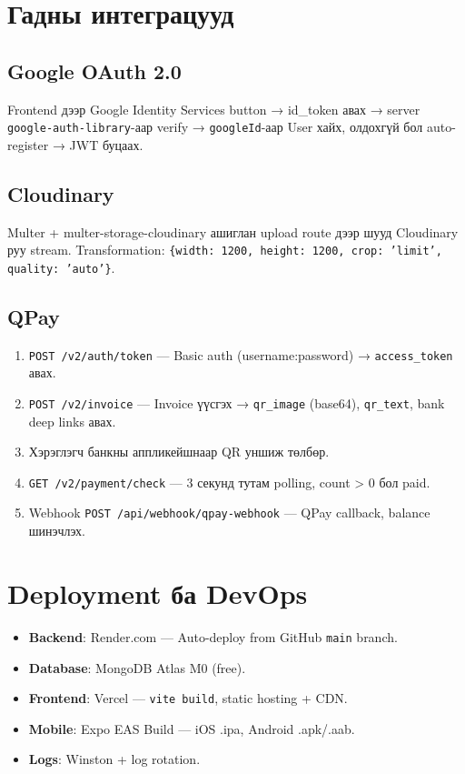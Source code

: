 \documentclass[12pt, a4paper]{report}
\begin{document}
\section{Гадны интеграцууд}

\subsection{Google OAuth 2.0}

Frontend дээр Google Identity Services button → id\_token авах → server \texttt{google-auth-library}-аар verify → \texttt{googleId}-аар User хайх, олдохгүй бол auto-register → JWT буцаах.

\subsection{Cloudinary}

Multer + multer-storage-cloudinary ашиглан upload route дээр шууд Cloudinary руу stream. Transformation: \texttt{\{width: 1200, height: 1200, crop: 'limit', quality: 'auto'\}}.

\subsection{QPay}

\begin{enumerate}
  \item \texttt{POST /v2/auth/token} — Basic auth (username:password) → \texttt{access\_token} авах.
  \item \texttt{POST /v2/invoice} — Invoice үүсгэх → \texttt{qr\_image} (base64), \texttt{qr\_text}, bank deep links авах.
  \item Хэрэглэгч банкны аппликейшнаар QR уншиж төлбөр.
  \item \texttt{GET /v2/payment/check} — 3 секунд тутам polling, count > 0 бол paid.
  \item Webhook \texttt{POST /api/webhook/qpay-webhook} — QPay callback, balance шинэчлэх.
\end{enumerate}

\section{Deployment ба DevOps}

\begin{itemize}
  \item \textbf{Backend}: Render.com — Auto-deploy from GitHub \texttt{main} branch.
  \item \textbf{Database}: MongoDB Atlas M0 (free).
  \item \textbf{Frontend}: Vercel — \texttt{vite build}, static hosting + CDN.
  \item \textbf{Mobile}: Expo EAS Build — iOS .ipa, Android .apk/.aab.
  \item \textbf{Logs}: Winston + log rotation.
\end{itemize}
\end{document}
